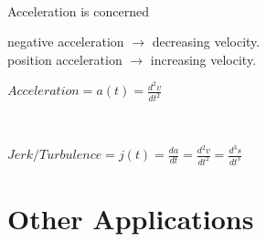 \documentclass[12pt,fleqn]{book} %
\begin{document}
\vspace*{2mm}

 \\
Acceleration is concerned

\begin{center}
    negative acceleration $\to$ decreasing velocity. \\
    position acceleration $\to$ increasing velocity.
\end{center}

\begin{center}
    {\large $Acceleration = a(t) = \frac{d^2v}{dt^2}$}

\end{center}

\vspace*{2mm}

 \\

\begin{center}
    {\large $Jerk/Turbulence = j(t) = \frac{da}{dt} = \frac{d^2v}{dt^2} = \frac{d^3s}{dt^3}$}
\end{center}


\vspace*{2mm}



\section{Other Applications}

\begin{center}

\end{center}

\vspace*{-3mm}

\pagebreak

\begin{center}

\end{center}
\end{document}
